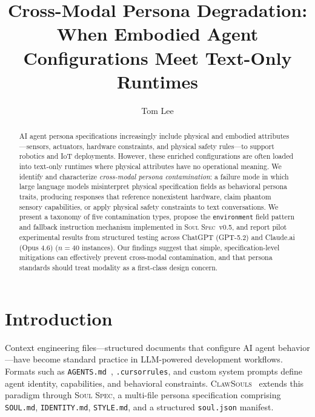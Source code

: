 \documentclass[manuscript,screen,nonacm]{acmart}
\begin{document}
\title{Cross-Modal Persona Degradation: When Embodied Agent Configurations Meet Text-Only Runtimes}

\author{Tom Lee}

\begin{abstract}
AI agent persona specifications increasingly include physical and embodied attributes---sensors, actuators, hardware constraints, and physical safety rules---to support robotics and IoT deployments.
However, these enriched configurations are often loaded into text-only runtimes where physical attributes have no operational meaning.
We identify and characterize \emph{cross-modal persona contamination}: a failure mode in which large language models misinterpret physical specification fields as behavioral persona traits, producing responses that reference nonexistent hardware, claim phantom sensory capabilities, or apply physical safety constraints to text conversations.
We present a taxonomy of five contamination types, propose the \texttt{environment} field pattern and fallback instruction mechanism implemented in \textsc{Soul Spec}~v0.5, and report pilot experimental results from structured testing across ChatGPT (GPT-5.2) and Claude.ai (Opus 4.6) ($n=40$ instances).
Our findings suggest that simple, specification-level mitigations can effectively prevent cross-modal contamination, and that persona standards should treat modality as a first-class design concern.
\end{abstract}


\maketitle

\section{Introduction}

Context engineering files---structured documents that configure AI agent behavior---have become standard practice in LLM-powered development workflows.
Formats such as \texttt{AGENTS.md}~\cite{jai2025agents}, \texttt{.cursorrules}, and custom system prompts define agent identity, capabilities, and behavioral constraints.
\textsc{ClawSouls}~\cite{clawsouls2026} extends this paradigm through \textsc{Soul Spec}, a multi-file persona specification comprising \texttt{SOUL.md}, \texttt{IDENTITY.md}, \texttt{STYLE.md}, and a structured \texttt{soul.json} manifest.
\end{document}
